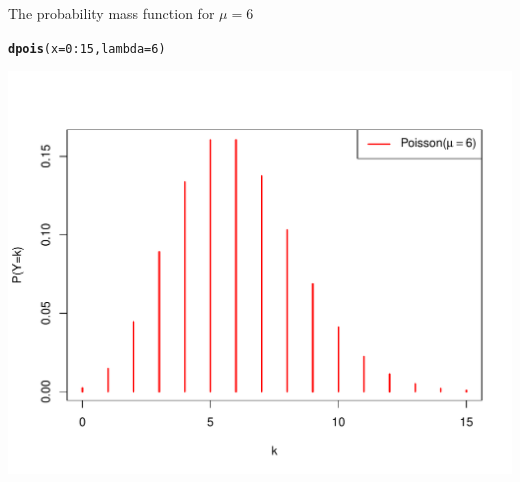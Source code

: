 \documentclass[10pt]{beamer}\usepackage[]{graphicx}\usepackage[]{color}
\makeatletter
\def\maxwidth{ %
  \ifdim\Gin@nat@width>\linewidth
    \linewidth
  \else
    \Gin@nat@width
  \fi
}
\newcommand{\hlnum}[1]{\textcolor[rgb]{0.686,0.059,0.569}{#1}}%
\newcommand{\hlopt}[1]{\textcolor[rgb]{0,0,0}{#1}}%
\newcommand{\hlstd}[1]{\textcolor[rgb]{0.345,0.345,0.345}{#1}}%
\newcommand{\hlkwc}[1]{\textcolor[rgb]{0.333,0.667,0.333}{#1}}%
\newcommand{\hlkwd}[1]{\textcolor[rgb]{0.737,0.353,0.396}{\textbf{#1}}}%
\newenvironment{kframe}{%
 \def\at@end@of@kframe{}%
 \ifinner\ifhmode%
  \def\at@end@of@kframe{\end{minipage}}%
  \begin{minipage}{\columnwidth}%
 \fi\fi%
 \def\FrameCommand##1{\hskip\@totalleftmargin \hskip-\fboxsep
 \colorbox{shadecolor}{##1}\hskip-\fboxsep
     \hskip-\linewidth \hskip-\@totalleftmargin \hskip\columnwidth}%
 \MakeFramed {\advance\hsize-\width
   \@totalleftmargin\z@ \linewidth\hsize
   \@setminipage}}%
 {\par\unskip\endMakeFramed%
 \at@end@of@kframe}
\newenvironment{knitrout}{}{} %
\makeatother
\begin{document}
\begin{frame}[fragile]{The probability mass function for $\mu=6$}
	
\begin{knitrout}\tiny
{}\color{fgcolor}\begin{kframe}
\begin{alltt}
\hlkwd{dpois}\hlstd{(}\hlkwc{x} \hlstd{=} \hlnum{0}\hlopt{:}\hlnum{15}\hlstd{,} \hlkwc{lambda} \hlstd{=} \hlnum{6}\hlstd{)}
\end{alltt}
\end{kframe}
\end{knitrout}
	
	\vspace*{-0.5in}
	
\begin{knitrout}\tiny
{}\color{fgcolor}

{\centering \includegraphics[width=\maxwidth]{figure/unnamed-chunk-10-1} 

}



\end{knitrout}
	
\end{frame}
\end{document}
